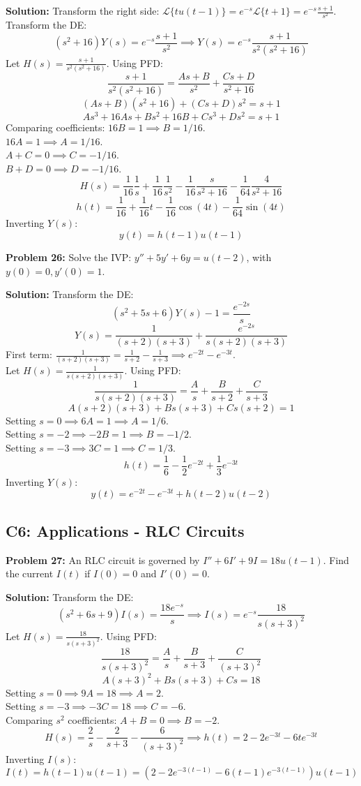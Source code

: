 \documentclass[11pt, letterpaper]{article}
\theoremstyle{definition}
\theoremstyle{remark}
\newcommand{\Lap}{\mathcal{L}}
\begin{document}
\textbf{Solution:}
Transform the right side: $\Lap\{t u(t-1)\} = e^{-s}\Lap\{t+1\} = e^{-s} \frac{s+1}{s^2}$.
Transform the DE:
\[ (s^2+16)Y(s) = e^{-s} \frac{s+1}{s^2} \implies Y(s) = e^{-s} \frac{s+1}{s^2(s^2+16)} \]
Let $H(s) = \frac{s+1}{s^2(s^2+16)}$. Using PFD:
\[ \frac{s+1}{s^2(s^2+16)} = \frac{As+B}{s^2} + \frac{Cs+D}{s^2+16} \]
\[ (As+B)(s^2+16) + (Cs+D)s^2 = s+1 \]
\[ As^3 + 16As + Bs^2 + 16B + Cs^3 + Ds^2 = s+1 \]
Comparing coefficients:
$16B = 1 \implies B = 1/16$. \\
$16A = 1 \implies A = 1/16$. \\
$A+C = 0 \implies C = -1/16$. \\
$B+D = 0 \implies D = -1/16$.
\[ H(s) = \frac{1}{16}\frac{1}{s} + \frac{1}{16}\frac{1}{s^2} - \frac{1}{16}\frac{s}{s^2+16} - \frac{1}{64}\frac{4}{s^2+16} \]
\[ h(t) = \frac{1}{16} + \frac{1}{16}t - \frac{1}{16}\cos(4t) - \frac{1}{64}\sin(4t) \]
Inverting $Y(s)$:
\[ y(t) = h(t-1)u(t-1) \]

\vspace{1em}
\textbf{Problem 26:} Solve the IVP: $y'' + 5y' + 6y = u(t-2)$, with $y(0) = 0, y'(0) = 1$.

\textbf{Solution:}
Transform the DE:
\[ (s^2+5s+6)Y(s) - 1 = \frac{e^{-2s}}{s} \]
\[ Y(s) = \frac{1}{(s+2)(s+3)} + \frac{e^{-2s}}{s(s+2)(s+3)} \]
First term: $\frac{1}{(s+2)(s+3)} = \frac{1}{s+2} - \frac{1}{s+3} \implies e^{-2t} - e^{-3t}$. \\
Let $H(s) = \frac{1}{s(s+2)(s+3)}$. Using PFD:
\[ \frac{1}{s(s+2)(s+3)} = \frac{A}{s} + \frac{B}{s+2} + \frac{C}{s+3} \]
\[ A(s+2)(s+3) + Bs(s+3) + Cs(s+2) = 1 \]
Setting $s=0 \implies 6A = 1 \implies A = 1/6$. \\
Setting $s=-2 \implies -2B = 1 \implies B = -1/2$. \\
Setting $s=-3 \implies 3C = 1 \implies C = 1/3$.
\[ h(t) = \frac{1}{6} - \frac{1}{2}e^{-2t} + \frac{1}{3}e^{-3t} \]
Inverting $Y(s)$:
\[ y(t) = e^{-2t} - e^{-3t} + h(t-2)u(t-2) \]

\subsection{C6: Applications - RLC Circuits}

\textbf{Problem 27:} An RLC circuit is governed by $I'' + 6I' + 9I = 18u(t-1)$. Find the current $I(t)$ if $I(0) = 0$ and $I'(0) = 0$.

\textbf{Solution:}
Transform the DE:
\[ (s^2+6s+9)I(s) = \frac{18e^{-s}}{s} \implies I(s) = e^{-s} \frac{18}{s(s+3)^2} \]
Let $H(s) = \frac{18}{s(s+3)^2}$. Using PFD:
\[ \frac{18}{s(s+3)^2} = \frac{A}{s} + \frac{B}{s+3} + \frac{C}{(s+3)^2} \]
\[ A(s+3)^2 + Bs(s+3) + Cs = 18 \]
Setting $s=0 \implies 9A = 18 \implies A = 2$. \\
Setting $s=-3 \implies -3C = 18 \implies C = -6$. \\
Comparing $s^2$ coefficients: $A + B = 0 \implies B = -2$.
\[ H(s) = \frac{2}{s} - \frac{2}{s+3} - \frac{6}{(s+3)^2} \implies h(t) = 2 - 2e^{-3t} - 6te^{-3t} \]
Inverting $I(s)$:
\[ I(t) = h(t-1)u(t-1) = \left( 2 - 2e^{-3(t-1)} - 6(t-1)e^{-3(t-1)} \right) u(t-1) \]
\end{document}
